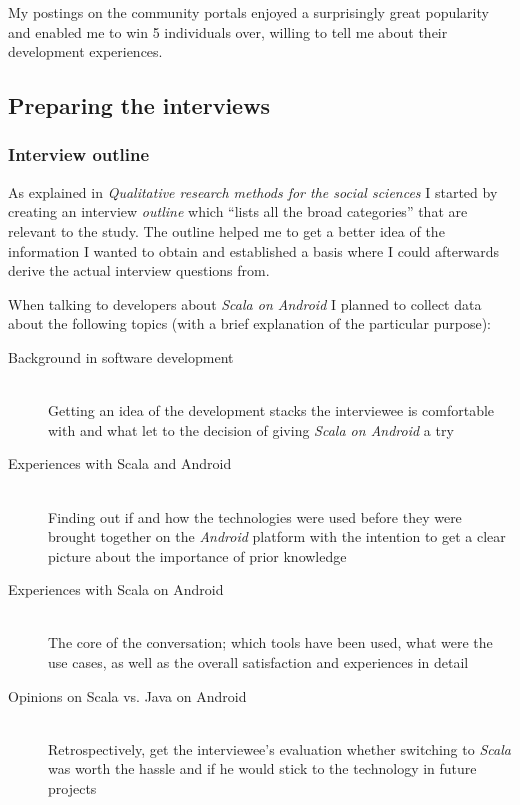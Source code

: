 My postings on the community portals enjoyed a surprisingly great popularity and enabled me to win 5 individuals over, willing to tell me about their development experiences.

\subsection{Preparing the interviews}

\subsubsection{Interview outline}

As explained in \textit{Qualitative research methods for the social sciences} I started by creating an interview \textit{outline} which \enquote{lists all the broad categories} \cite[p. 72]{berg01} that are relevant to the study. The outline helped me to get a better idea of the information I wanted to obtain and established a basis where I could afterwards derive the actual interview questions from.

When talking to developers about \textit{Scala on Android} I planned to collect data about the following topics (with a brief explanation of the particular purpose):

\begin{description}

	\item[Background in software development]\hfill \\

	Getting an idea of the development stacks the interviewee is comfortable with and what let to the decision of giving \textit{Scala on Android} a try

	\item[Experiences with Scala and Android]\hfill \\

	Finding out if and how the technologies were used before they were brought together on the \textit{Android} platform with the intention to get a clear picture about the importance of prior knowledge

	\item[Experiences with Scala on Android]\hfill \\

	The core of the conversation; which tools have been used, what were the use cases, as well as the overall satisfaction and experiences in detail

	\item[Opinions on Scala vs. Java on Android]\hfill \\

	Retrospectively, get the interviewee's evaluation whether switching to \textit{Scala} was worth the hassle and if he would stick to the technology in future projects

\end{description}

